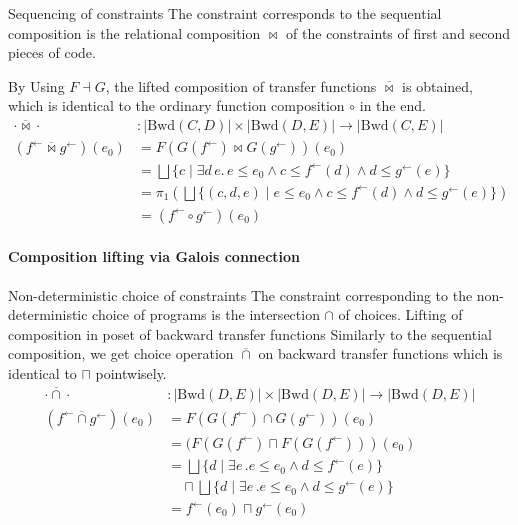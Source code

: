 \documentclass{llncs}
\newcommand{\Unidir}{\mathrm{Bwd}}
\newcommand{\fb}{{f^{\leftarrow}}}
\newcommand{\gb}{{g^{\leftarrow}}}
\newcommand{\bigjoin}{\bigsqcup}
\newcommand{\meet}{\sqcap}
\newcommand{\comp}{\circ}
\newcommand{\bowtielift}{\mathbin{\overline{\bowtie}}}
\newcommand{\caplift}{\mathbin{\overline{\cap}}}
\begin{document}
  Sequencing of constraints
    The constraint corresponds to the sequential composition is the relational composition $\bowtie$ of the constraints of first and second pieces of code.

    By Using $F \dashv G$, the lifted composition of transfer functions $\bowtielift$ is obtained, which is identical to the ordinary function composition $\comp$ in the end.
    \begin{align*}
      \cdot \bowtielift \cdot &: \left| \Unidir(C, D) \right| \times  \left| \Unidir(D, E) \right| \to  \left| \Unidir(C, E) \right| \\
      (\fb \bowtielift \gb) (e_{0}) &= F(G(\fb) \bowtie G(\gb)) (e_{0}) \\
                                  &= \bigjoin \{ c \mid \exists d\, e.\,e \leq e_{0} \land c \leq \fb(d) \land d \leq \gb(e) \} \\
                                  &= \pi_{1} (\bigjoin \{ (c, d , e) \mid e \leq e_{0} \land c \leq \fb(d) \land d \leq \gb(e) \}) \\
                                  &= (\fb \comp \gb)(e_{0})
    \end{align*}

  \paragraph{Composition lifting via Galois connection}

  Non-deterministic choice of constraints
    The constraint corresponding to the non-deterministic choice of programs is the intersection $\cap$ of choices.
 Lifting of composition in poset of backward transfer functions
    Similarly to the sequential composition, we get choice operation $\caplift$ on backward transfer functions which is identical to $\meet$ pointwisely.
    \begin{align*}
      \cdot \caplift \cdot &: \left| \Unidir(D , E) \right| \times  \left| \Unidir(D, E) \right| \to \left| \Unidir(D, E) \right| \\
      (\fb \caplift \gb) (e_{0})
      &= F(G(\fb) \cap G(\gb)) (e_{0}) \\
      &= (F(G(\fb) \meet F(G(\fb))) (e_{0}) \\
      &= \bigjoin \{ d \mid \exists e\,. e \leq e_{0} \land d \leq \fb(e) \} \\ &\quad \meet \bigjoin \{ d \mid \exists e\,. e \leq e_{0} \land d \leq \gb(e) \} \\
      &= \fb(e_{0}) \meet \gb(e_{0})
    \end{align*}
\end{document}
